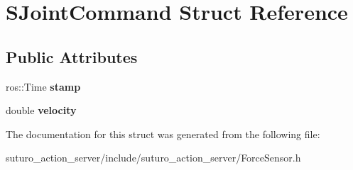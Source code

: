 \hypertarget{structSJointCommand}{\section{S\-Joint\-Command Struct Reference}
\label{structSJointCommand}
}
\subsection*{Public Attributes}
\begin{DoxyCompactItemize}
\item 
\hypertarget{structSJointCommand_a61c069ae8cd85a854353013cb73d6b40}{ros\-::\-Time {\bfseries stamp}}\label{structSJointCommand_a61c069ae8cd85a854353013cb73d6b40}

\item 
\hypertarget{structSJointCommand_a77749ab70767774fedb9560af4d4e45a}{double {\bfseries velocity}}\label{structSJointCommand_a77749ab70767774fedb9560af4d4e45a}

\end{DoxyCompactItemize}


The documentation for this struct was generated from the following file\-:\begin{DoxyCompactItemize}
\item 
suturo\-\_\-action\-\_\-server/include/suturo\-\_\-action\-\_\-server/Force\-Sensor.\-h\end{DoxyCompactItemize}
